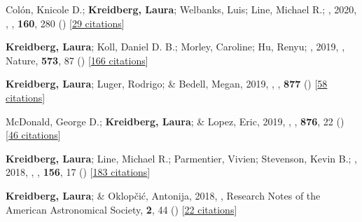 \item[{\color{numcolor}\scriptsize17}] Col{\'o}n, Knicole D.; \textbf{Kreidberg, Laura}; Welbanks, Luis; Line, Michael R.; \etal, 2020, , \aj, \textbf{160}, 280 () [\href{https://ui.adsabs.harvard.edu/abs/2020AJ....160..280C}{29 citations}]

\item[{\color{numcolor}\scriptsize16}] \textbf{Kreidberg, Laura}; Koll, Daniel D. B.; Morley, Caroline; Hu, Renyu; \etal, 2019, , Nature, \textbf{573}, 87 () [\href{https://ui.adsabs.harvard.edu/abs/2019Natur.573...87K}{166 citations}]

\item[{\color{numcolor}\scriptsize15}] \textbf{Kreidberg, Laura}; Luger, Rodrigo; \& Bedell, Megan, 2019, , \apj, \textbf{877} () [\href{https://ui.adsabs.harvard.edu/abs/2019ApJ...877L..15K}{58 citations}]

\item[{\color{numcolor}\scriptsize14}] McDonald, George D.; \textbf{Kreidberg, Laura}; \& Lopez, Eric, 2019, , \apj, \textbf{876}, 22 () [\href{https://ui.adsabs.harvard.edu/abs/2019ApJ...876...22M}{46 citations}]

\item[{\color{numcolor}\scriptsize13}] \textbf{Kreidberg, Laura}; Line, Michael R.; Parmentier, Vivien; Stevenson, Kevin B.; \etal, 2018, , \aj, \textbf{156}, 17 () [\href{https://ui.adsabs.harvard.edu/abs/2018AJ....156...17K}{183 citations}]

\item[{\color{numcolor}\scriptsize12}] \textbf{Kreidberg, Laura}; \& Oklop{\v{c}}i{\'c}, Antonija, 2018, , Research Notes of the American Astronomical Society, \textbf{2}, 44 () [\href{https://ui.adsabs.harvard.edu/abs/2018RNAAS...2...44K}{22 citations}]

